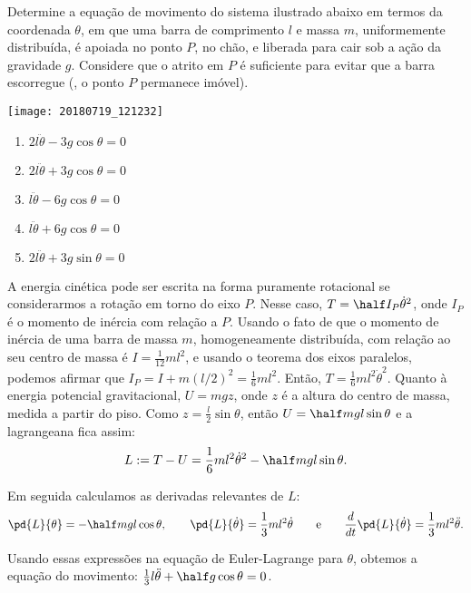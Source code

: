 \begin{question}
  	Determine a equação de movimento do sistema ilustrado abaixo em termos da coordenada $\theta$, em que uma barra de comprimento $l$ e massa $m$, uniformemente distribuída, é apoiada no ponto $P$, no chão, e liberada para cair sob a ação da gravidade $g$.
  	Considere que o atrito em $P$ é suficiente para evitar que a barra escorregue (\ie, o ponto $P$ permanece imóvel).

		\begin{center}
      \texttt{[image: 20180719\_121232]}
    \end{center}

  	\begin{enumerate}
  		\item $2l \ddot \theta - 3g\cos\theta = 0$
  		\item $2l \ddot \theta + 3g\cos\theta = 0$ \rightanswer
  		\item $l \ddot\theta - 6 g \cos\theta = 0$
  		\item $l \ddot\theta + 6 g \cos\theta = 0$
  		\item $2l \ddot \theta + 3g\sin\theta = 0$
  	\end{enumerate}

    \begin{solution}
      A energia cinética pode ser escrita na forma puramente rotacional se considerarmos a rotação em torno do eixo $P$.
      Nesse caso, $T = \half I_P \dot\theta^2$, onde $I_P$ é o momento de inércia com relação a $P$.
      Usando o fato de que o momento de inércia de uma barra de massa $m$, homogeneamente distribuída, com relação ao seu centro de massa é $I = \frac{1}{12} m l^2$, e usando o teorema dos eixos paralelos, podemos afirmar que $I_P = I + m(l/2)^2 = \frac{1}{6}ml^2$.
      Então, $T = \frac{1}{6}ml^2 \dot\theta^2$.
      Quanto à energia potencial gravitacional, $U = mgz$, onde $z$ é a altura do centro de massa, medida a partir do piso.
      Como $z = \frac{l}{2}\sin\theta$, então $U = \half mgl \sin\theta$ e a lagrangeana fica assim:
      \begin{equation*}
        L := T - U = \frac{1}{6}ml^2 \dot\theta^2 - \half mgl \sin\theta.
      \end{equation*}

      Em seguida calculamos as derivadas relevantes de $L$:
      \begin{equation*}
        \pd{L}{\theta} = -\half mgl\cos\theta,
        \qquad
        \pd{L}{\dot\theta} = \frac{1}{3}ml^2\dot \theta
        \qquad\text{e}\qquad
        \frac{d}{dt}\pd{L}{\dot\theta} = \frac{1}{3}ml^2\ddot \theta.
      \end{equation*}

      Usando essas expressões na equação de Euler-Lagrange para $\theta$, obtemos a equação do movimento: $\frac{1}{3}l\ddot \theta + \half g\cos\theta = 0$.
    \end{solution}
\end{question}